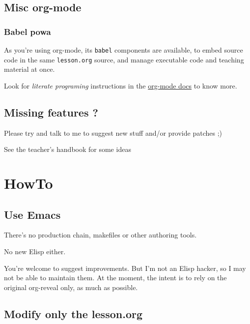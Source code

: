 \documentclass[a4paper]{article}
\begin{document}
\subsection{Misc org-mode}
\label{sec:orgd85ffef}

\subsubsection{Babel powa}
\label{sec:orgef8e7bf}
As you're using org-mode, its \texttt{babel} components are available, to embed source code in the same \texttt{lesson.org} source, and manage executable code and teaching material at once.

Look for \emph{literate programing} instructions in the \href{http://orgmode.org/manual/Working-with-source-code.html}{org-mode docs} to know more.

\subsection{Missing features ?}
\label{sec:org35c3c46}

Please try and talk to me to suggest new stuff and/or provide patches ;)

\begin{NOTES}
See the teacher's handbook for some ideas
\end{NOTES}

\section{HowTo}
\label{sec:org5ef9246}
\subsection{Use Emacs}
\label{sec:orgaba3df7}

There's no production chain, makefiles or other authoring tools. 

No new Elisp either.

\begin{NOTES}
You're welcome to suggest improvements. But I'm not an Elisp hacker,
so I may not be able to maintain them. At the moment, the intent is to
rely on the original org-reveal only, as much as possible.
\end{NOTES}

\subsection{Modify only the lesson.org}
\label{sec:orgcc7537d}
\end{document}
